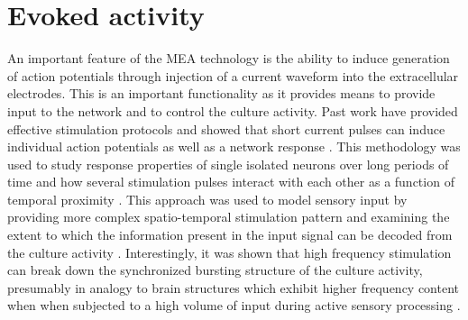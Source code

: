     \section{Evoked activity}
    \label{sec:activity:evoked}
    An important feature of the MEA technology is the ability to induce generation of action potentials through injection of a current waveform into the extracellular electrodes. This is an important functionality as it provides means to provide input to the network and to control the culture activity. Past work have provided effective stimulation protocols and showed that short current pulses can induce individual action potentials as well as a network response \cite{marom2002development,wagenaar2004effective}. This methodology was used to study response properties of single isolated neurons over long periods of time \cite{gal2013entrainment} and how several stimulation pulses interact with each other as a function of temporal proximity \cite{eytan2003selective,weihberger2013quantitative,baljon2009interaction}. This approach was used to model sensory input by providing more complex spatio-temporal stimulation pattern and examining the extent to which the information present in the input signal can be decoded from the culture activity \cite{marom2009precarious,cozzi2006encoding}. Interestingly, it was shown that high frequency stimulation can break down the synchronized bursting structure of the culture activity, presumably in analogy to brain structures which exhibit higher frequency content when when subjected to a high volume of input during active sensory processing \cite{wagenaar2005controlling}.

